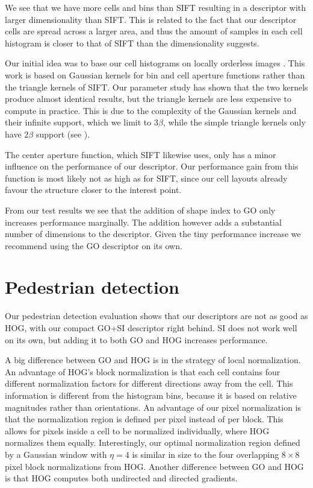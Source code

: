 \documentclass[thesis.tex]{subfiles}
\begin{document}
We see that we have more cells and bins than SIFT resulting in a descriptor with larger dimensionality than SIFT. This is related to the fact that our descriptor cells are spread across a larger area, and thus the amount of samples in each cell histogram is closer to that of SIFT than the dimensionality suggests.

Our initial idea was to base our cell histograms on locally orderless images \cite{koenderink1999structure}. This work is based on Gaussian kernels for bin and cell aperture functions rather than the triangle kernels of SIFT. Our parameter study has shown that the two kernels produce almost identical results, but the triangle kernels are less expensive to compute in practice. This is due to the complexity of the Gaussian kernels and their infinite support, which we limit to 3$\beta$, while the simple triangle kernels only have $2\beta$ support (see ).

The center aperture function, which SIFT likewise uses, only has a minor influence on the performance of our descriptor. Our performance gain from this function is most likely not as high as for SIFT, since our cell layouts already favour the structure closer to the interest point.

From our test results we see that the addition of shape index to GO only increases performance marginally. The addition however adds a substantial number of dimensions to the descriptor.
Given the tiny performance increase we recommend using the GO descriptor on its own.

\section{Pedestrian detection}
\label{sec:discussionOd}

Our pedestrian detection evaluation shows that our descriptors are not as good as HOG, with our compact GO+SI descriptor right behind. SI does not work well on its own, but adding it to both GO and HOG increases performance.

A big difference between GO and HOG is in the strategy of local normalization. An advantage of HOG's block normalization is that each cell contains four different normalization factors for different directions away from the cell. This information is different from the histogram bins, because it is based on relative magnitudes rather than orientations. An advantage of our pixel normalization is that the normalization region is defined per pixel instead of per block. This allows for pixels inside a cell to be normalized individually, where HOG normalizes them equally. Interestingly, our optimal normalization region defined by a Gaussian window with $\eta = 4$ is similar in size to the four overlapping $8 \times 8$ pixel block normalizations from HOG. Another difference between GO and HOG is that HOG computes both undirected and directed gradients.
\end{document}
